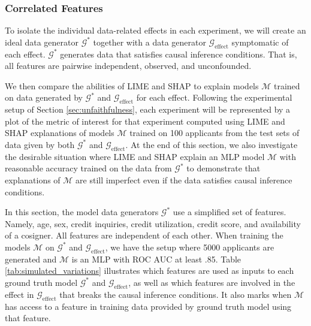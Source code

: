\documentclass[mnsc,blindrev]{informs3}
\begin{document}
        \subsubsection{Correlated Features}
            To isolate the individual data-related effects in each experiment, we will create an ideal data generator $\mathcal{G}^*$ together with a data generator $\mathcal{G}_{\text{effect}}$ symptomatic of each effect. $\mathcal{G}^*$ generates data that satisfies causal inference conditions. That is, all features are pairwise independent, observed, and unconfounded.
        
            We then compare the abilities of LIME and SHAP to explain models $\mathcal{M}$ trained on data generated by $\mathcal{G}^*$ and $\mathcal{G}_{\text{effect}}$ for each effect. Following the experimental setup of Section \ref{sec:unfaithfulness}, each experiment will be represented by a plot of the metric of interest for that experiment computed using LIME and SHAP explanations of models $\mathcal{M}$ trained on 100 applicants from the test sets of data given by both $\mathcal{G}^*$ and $\mathcal{G}_{\text{effect}}$.  At the end of this section, we also investigate the desirable situation where LIME and SHAP explain an MLP model $\mathcal{M}$ with reasonable accuracy trained on the data from $\mathcal{G}^*$ to demonstrate that explanations of $\mathcal{M}$ are still imperfect even if the data satisfies causal inference conditions. 
    
            In this section, the model data generators $\mathcal{G}^*$ use a simplified set of features. Namely, age, sex, credit inquiries, credit utilization, credit score, and availability of a cosigner. All features are independent of each other. When training the models $\mathcal{M}$ on $\mathcal{G}^*$ and $\mathcal{G}_{\text{effect}}$, we have the setup where 5000 applicants are generated and $\mathcal{M}$ is an MLP with ROC AUC at least .85. Table \ref{tab:simulated_variations} illustrates which features are used as inputs to each ground truth model $\mathcal{G}^*$ and $\mathcal{G}_{\text{effect}}$, as well as which features are involved in the effect in $\mathcal{G}_{\text{effect}}$ that breaks the causal inference conditions. It also marks when $\mathcal{M}$ has access to a feature in training data provided by ground truth model using that feature. %
        
        
\end{document}
